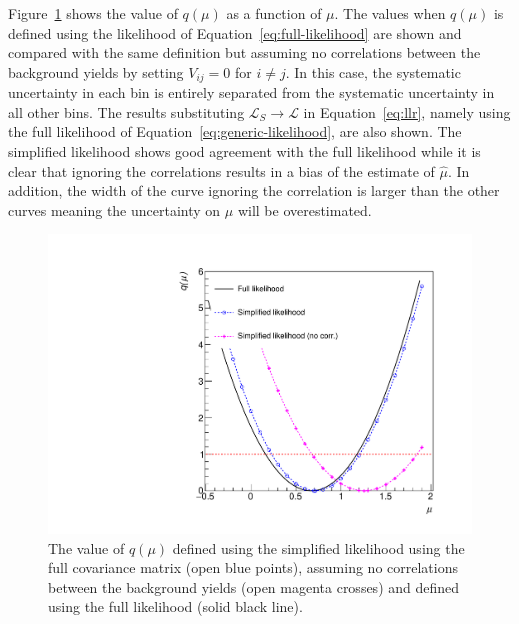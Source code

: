 Figure~\ref{fig:likelihoodscan} shows the value of $q(\mu)$ as a function of $\mu$. The values when $q(\mu)$ 
is defined using the likelihood of Equation~\ref{eq:full-likelihood} are shown and compared with the same definition but assuming no correlations between the 
background yields by setting $V_{ij}=0$ for $i\neq j$. In this case, the systematic uncertainty in each bin is entirely separated
from the systematic uncertainty in all other bins. The results substituting $\mathcal{L}_{S}\rightarrow\mathcal{L}$ in Equation~\ref{eq:llr}, 
namely using the full likelihood of Equation~\ref{eq:generic-likelihood}, are also shown. The simplified 
likelihood shows good agreement with the full likelihood while it is clear that ignoring the correlations results in a bias of the estimate of $\hat{\mu}$. In 
addition, the width of the curve ignoring the correlation is larger than the other curves meaning the uncertainty on $\mu$ will be overestimated.  


\begin{figure}[hbt]
  \begin{center} 
   \includegraphics[width=1.5\cmsFigWidth]{figures/r.pdf}
   \caption{The value of $q(\mu)$ defined using the simplified likelihood using the full covariance matrix (open blue points), assuming no correlations between the 
   background yields (open magenta crosses) and defined using the full likelihood (solid black line).}
   \label{fig:likelihoodscan} 
  \end{center}
\end{figure}


